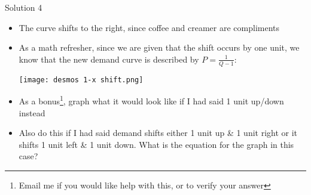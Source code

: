\documentclass[10pt,xcolor={svgnames}]{beamer}
\begin{document}
\begin{frame}{Solution 4}
    \begin{itemize}
        \item The curve shifts to the right, since coffee and creamer are compliments
        \item As a math refresher, since we are given that the shift occurs by one unit, we know that the new demand curve is described by $P=\frac{1}{Q-1}$:
        \begin{center}
            \texttt{[image: desmos 1-x shift.png]}
        \end{center}
        \item As a bonus\footnote{Email me if you would like help with this, or to verify your answer}, graph what it would look like if I had said 1 unit up/down instead
        \item Also do this if I had said demand shifts either 1 unit up \& 1 unit right or it shifts 1 unit left \& 1 unit down. What is the equation for the graph in this case?
    \end{itemize}
    \label{Sol4}
\end{frame}
\end{document}
